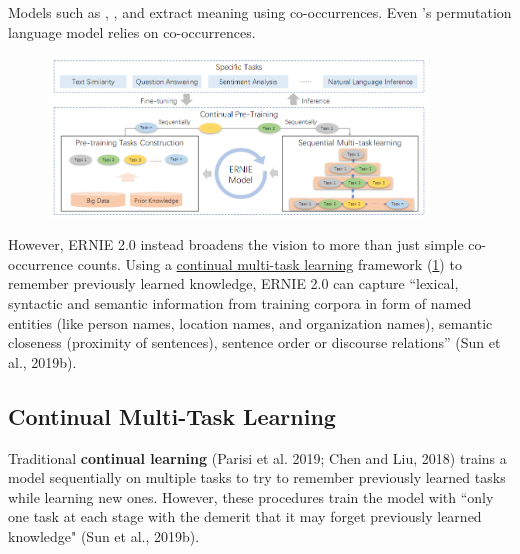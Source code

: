 Models such as , , and  extract meaning using co-occurrences. Even 's permutation language model relies on co-occurrences. 


\begin{figure}[h]
\vspace{-5pt}
\centering
\includegraphics[width=0.9\textwidth]{imgs/ernie2_framework.png}
\vspace{-5pt}
\vspace{-5pt}
\label{fig:ernie2_framework}
\end{figure}


However, ERNIE 2.0 instead broadens the vision to more than just simple co-occurrence counts. Using a \hyperref[sec:ContinualMultiTaskLearning]{continual multi-task learning} framework (\cref{fig:ernie2_framework}) to remember previously learned knowledge, ERNIE 2.0 can capture ``lexical, syntactic and semantic information from training corpora in form of named entities (like person names,
location names, and organization names), semantic closeness (proximity of sentences),
sentence order or discourse relations” (Sun et al., 2019b).

\subsection{Continual Multi-Task Learning}\label{sec:ContinualMultiTaskLearning}

Traditional \textbf{continual learning} (Parisi et al. 2019; Chen and Liu, 2018) trains a model sequentially on multiple tasks to try to remember previously learned tasks while learning new ones. However, these procedures train the model with ``only one task at each stage with the demerit that it may forget previously learned knowledge" (Sun et al., 2019b). 





